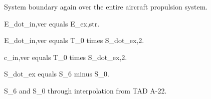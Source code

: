 System boundary again over the entire aircraft propulsion system.

E_dot_in,ver equals E_ex,str.

E_dot_in,ver equals T_0 times S_dot_ex,2.

c_in,ver equals T_0 times S_dot_ex,2.

S_dot_ex equals S_6 minus S_0.

S_6 and S_0 through interpolation from TAD A-22.